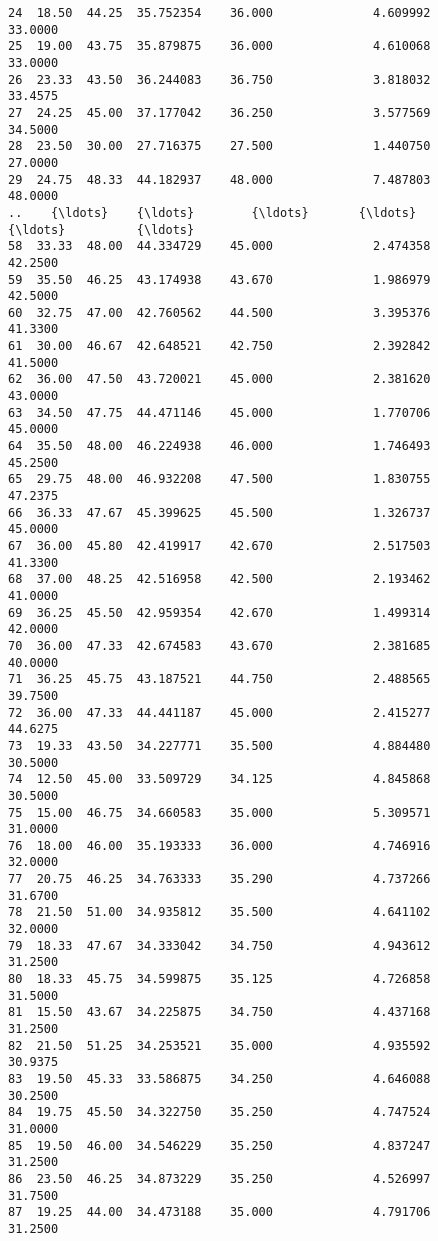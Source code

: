 \documentclass[11pt]{article}
\begin{document}
\begin{Verbatim}[commandchars=\\\{\}]
24  18.50  44.25  35.752354    36.000              4.609992      33.0000   
25  19.00  43.75  35.879875    36.000              4.610068      33.0000   
26  23.33  43.50  36.244083    36.750              3.818032      33.4575   
27  24.25  45.00  37.177042    36.250              3.577569      34.5000   
28  23.50  30.00  27.716375    27.500              1.440750      27.0000   
29  24.75  48.33  44.182937    48.000              7.487803      48.0000   
..    {\ldots}    {\ldots}        {\ldots}       {\ldots}                   {\ldots}          {\ldots}   
58  33.33  48.00  44.334729    45.000              2.474358      42.2500   
59  35.50  46.25  43.174938    43.670              1.986979      42.5000   
60  32.75  47.00  42.760562    44.500              3.395376      41.3300   
61  30.00  46.67  42.648521    42.750              2.392842      41.5000   
62  36.00  47.50  43.720021    45.000              2.381620      43.0000   
63  34.50  47.75  44.471146    45.000              1.770706      45.0000   
64  35.50  48.00  46.224938    46.000              1.746493      45.2500   
65  29.75  48.00  46.932208    47.500              1.830755      47.2375   
66  36.33  47.67  45.399625    45.500              1.326737      45.0000   
67  36.00  45.80  42.419917    42.670              2.517503      41.3300   
68  37.00  48.25  42.516958    42.500              2.193462      41.0000   
69  36.25  45.50  42.959354    42.670              1.499314      42.0000   
70  36.00  47.33  42.674583    43.670              2.381685      40.0000   
71  36.25  45.75  43.187521    44.750              2.488565      39.7500   
72  36.00  47.33  44.441187    45.000              2.415277      44.6275   
73  19.33  43.50  34.227771    35.500              4.884480      30.5000   
74  12.50  45.00  33.509729    34.125              4.845868      30.5000   
75  15.00  46.75  34.660583    35.000              5.309571      31.0000   
76  18.00  46.00  35.193333    36.000              4.746916      32.0000   
77  20.75  46.25  34.763333    35.290              4.737266      31.6700   
78  21.50  51.00  34.935812    35.500              4.641102      32.0000   
79  18.33  47.67  34.333042    34.750              4.943612      31.2500   
80  18.33  45.75  34.599875    35.125              4.726858      31.5000   
81  15.50  43.67  34.225875    34.750              4.437168      31.2500   
82  21.50  51.25  34.253521    35.000              4.935592      30.9375   
83  19.50  45.33  33.586875    34.250              4.646088      30.2500   
84  19.75  45.50  34.322750    35.250              4.747524      31.0000   
85  19.50  46.00  34.546229    35.250              4.837247      31.2500   
86  23.50  46.25  34.873229    35.250              4.526997      31.7500   
87  19.25  44.00  34.473188    35.000              4.791706      31.2500   


\end{Verbatim}
\end{document}
